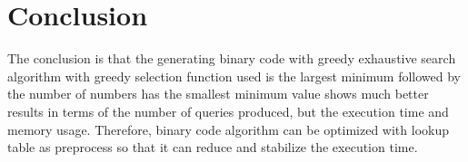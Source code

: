 \documentclass{TTP_DSL2006}
\begin{document}
\section{Conclusion}
\noindent The conclusion is that the generating binary code with greedy exhaustive search algorithm with greedy selection function used is the largest minimum followed by the number of numbers has the smallest minimum value shows much better results in terms of the number of queries produced, but the execution time and memory usage. Therefore, binary code algorithm can be optimized with lookup table as preprocess so that it can reduce and stabilize the execution time.


\end{document}
